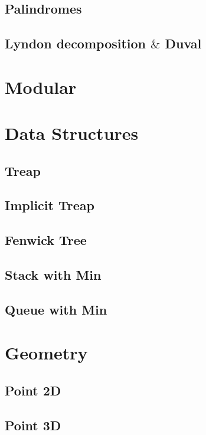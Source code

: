 \documentclass[10pt]{article}
\begin{document}
\subsection{Palindromes}

\subsection{Lyndon decomposition $\&$ Duval}




\newpage
\section{Modular}




\newpage
\section{Data Structures}
\subsection{Treap}

\subsection{Implicit Treap}

\subsection{Fenwick Tree}

\subsection{Stack with Min}

\subsection{Queue with Min}




\newpage
\section{Geometry}
\subsection{Point 2D}

\subsection{Point 3D}




\newpage

\end{document}
